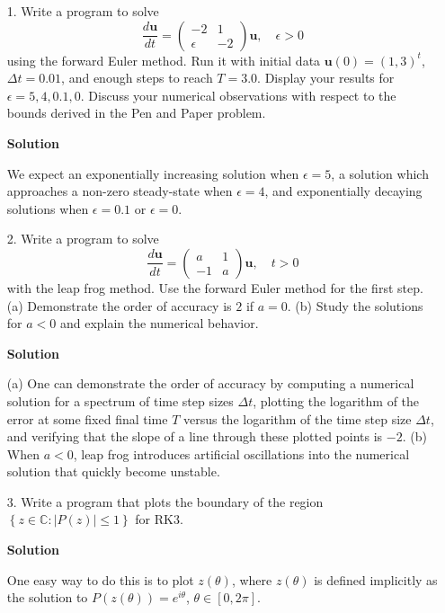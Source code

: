 \documentclass{article}
\begin{document}
\begin{itemize}

\item[1.] Write a program to solve
\begin{equation*}
\frac{d \mathbf{u}}{dt} = \begin{pmatrix} -2 & 1 \\ \epsilon & -2 \end{pmatrix} \mathbf{u}, \quad \epsilon > 0
\end{equation*}
using the forward Euler method.  Run it with initial data $\mathbf{u}(0) = (1,3)^t$, $\Delta t = 0.01$, and enough steps to reach $T = 3.0$. Display your results for $\epsilon = 5, 4, 0.1, 0$. Discuss your numerical observations with respect to the bounds derived in the Pen and Paper problem.

{\bf Solution}

We expect an exponentially increasing solution when $\epsilon = 5$, a solution which approaches a non-zero steady-state when $\epsilon = 4$, and exponentially decaying solutions when $\epsilon = 0.1$ or $\epsilon = 0$.

\item[2.] Write a program to solve
\begin{equation*}
\frac{d \mathbf{u}}{dt} = \begin{pmatrix} a & 1 \\ -1 & a \end{pmatrix} \mathbf{u}, \quad t > 0
\end{equation*}
with the leap frog method. Use the forward Euler method for the first step. (a) Demonstrate the order of accuracy is $2$ if $a = 0$. (b) Study the solutions for $a < 0$ and explain the numerical behavior.

{\bf Solution}

(a) One can demonstrate the order of accuracy by computing a numerical solution for a spectrum of time step sizes $\Delta t$, plotting the logarithm of the error at some fixed final time $T$ versus the logarithm of the time step size $\Delta t$, and verifying that the slope of a line through these plotted points is $-2$. (b) When $a < 0$, leap frog introduces artificial oscillations into the numerical solution that quickly become unstable.

\item[3.] Write a program that plots the boundary of the region $\left\{ z \in \mathbb{C} : \left\lvert P(z) \right\rvert \leq 1 \right\}$ for RK3.

{\bf Solution}

One easy way to do this is to plot $z(\theta)$, where $z(\theta)$ is defined implicitly as the solution to $P(z(\theta)) = e^{i \theta}$, $\theta \in [0, 2\pi]$.

\end{itemize}
\end{document}
